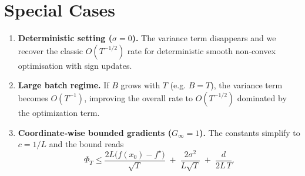 \documentclass{article}
\begin{document}
\section*{Special Cases}
\begin{enumerate}[label=\alph*)]
\item \textbf{Deterministic setting ($\sigma=0$).}  
The variance term disappears and we recover the classic $O(T^{-1/2})$ rate for deterministic smooth non‑convex optimisation with sign updates.
\item \textbf{Large batch regime.}  
If $B$ grows with $T$ (e.g. $B=T$), the variance term becomes $O(T^{-1})$, improving the overall rate to $O(T^{-1/2})$ dominated by the optimization term.
\item \textbf{Coordinate‑wise bounded gradients ($G_{\infty}=1$).}  
The constants simplify to $c=1/L$ and the bound reads
\[
\Phi_{T}\le
\frac{2L\bigl(f(x_{0})-f^{\star}\bigr)}{\sqrt{T}}
\;+\;
\frac{2\sigma^{2}}{L\sqrt{T}}
\;+\;
\frac{d}{2L\,T}.
\]
\end{enumerate}
\end{document}
